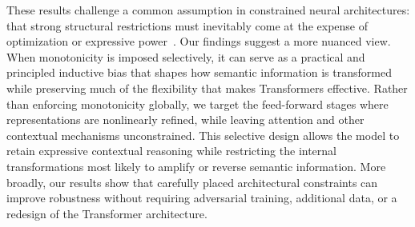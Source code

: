 \documentclass{article}
\theoremstyle{plain}
\theoremstyle{definition}
\theoremstyle{remark}
\begin{document}


These results challenge a common assumption in constrained neural architectures:
that strong structural restrictions must inevitably come at the expense of
optimization or expressive power~\citep[see the discussion in][]{sartor2025advancing}.
Our findings
suggest a more nuanced view. When monotonicity is imposed selectively, it can
serve as a practical and principled inductive bias that shapes how semantic
information is transformed while preserving much of the flexibility that makes
Transformers effective. Rather than enforcing monotonicity globally, we target
the feed-forward stages where representations are nonlinearly refined, while
leaving attention and other contextual mechanisms unconstrained. This selective
design allows the model to retain expressive contextual reasoning while
restricting the internal transformations most likely to amplify or reverse
semantic information. More broadly, our results show that carefully placed
architectural constraints can improve robustness without
requiring adversarial training, additional data, or a redesign of the
Transformer architecture. %
\end{document}
